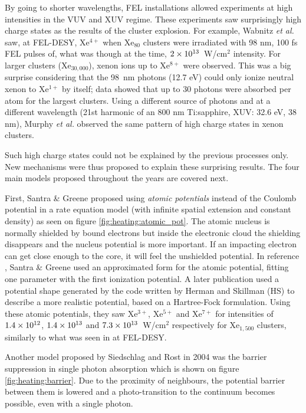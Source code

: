 By going to shorter wavelengths, FEL installations allowed experiments at high
intensities in the VUV and XUV regime. These experiments saw surprisingly
high charge states as the results of the cluster
explosion\cite{Wabnitz2002,Bostedt2010}. For example, Wabnitz \textit{et al.}
saw, at FEL-DESY, Xe$^{4+}$ when Xe$_{80}$ clusters were irradiated with 98 nm,
100 fs FEL pulses of, what was though at the time, $\ten{2}{13}$~W/cm$^2$
intensity. For larger clusters (Xe$_{30,000}$), xenon ions up to
Xe$^{8+}$ were observed. This was a big surprise considering that the 98~nm
photons (12.7 eV) could only ionize neutral xenon to Xe$^{1+}$ by itself;
data showed that up to 30 photons were absorbed per atom for the largest
clusters. Using a different source of photons and at a different wavelength
(21st harmonic of an 800 nm Ti:sapphire, XUV: 32.6 eV, 38 nm),
Murphy \textit{et al.} observed the same pattern of high charge states in xenon
clusters\cite{Murphy2008a,Murphy2008b}.

Such high charge states could not be explained by the previous processes only.
New mechanisms were thus proposed to explain these surprising results.
The four main models proposed throughout the years are covered next.



First, Santra \& Greene proposed using \textit{atomic potentials} instead of
the Coulomb potential in a rate equation model (with infinite spatial
extension and
constant density) as seen on figure \ref{fig:heating:atomic_pot}.
The atomic nucleus is normally shielded by bound electrons but inside the
electronic cloud the shielding disappears and the nucleus potential is more
important. If an impacting electron can get close enough to the core, it will
feel the unshielded potential.
In reference \cite{Greene2003}, Santra \& Greene used an approximated form for
the atomic potential, fitting one parameter with the first ionization potential.
A later\cite{Walters2006} publication used a
potential shape generated by the code written by Herman and
Skillman\cite{HS1963} (HS) to describe a more realistic
potential, based on a
Hartree-Fock formulation. Using these atomic potentials, they saw Xe$^{3+}$,
Xe$^{5+}$ and Xe$^{7+}$ for intensities of $\ten{1.4}{12}$, $\ten{1.4}{13}$ and
$\ten{7.3}{13}$~W/cm$^2$ respectively for Xe$_{1,500}$ clusters, similarly to
what was seen in at FEL-DESY.

\newpage
{}

Another model proposed by Siedschlag and Rost\cite{Siedschlag2004} in 2004 was
the barrier suppression in single photon absorption which is shown on figure
\ref{fig:heating:barrier}. Due to the proximity
of neighbours, the potential barrier between them is lowered and
a photo-transition to the continuum becomes possible, even with a single photon.

